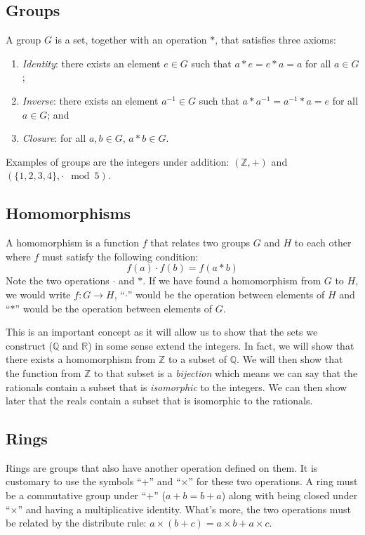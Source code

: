 \documentclass[]{scrartcl}
\theoremstyle{definition}
\newcommand{\bb}[1]{\mathbb{#1}}
\newcommand{\Z}{\bb{Z}}
\newcommand{\Q}{\bb{Q}}
\newcommand{\R}{\bb{R}}
\begin{document}
\subsection{Groups}
A group $G$ is a set, together with an operation $*$, that satisfies three axioms:
\begin{enumerate}
    \item \textit{Identity}: there exists an element $e\in G$ such that $a*e = e*a = a$ for all $a\in G$;
    \item \textit{Inverse}: there exists an element $a^{-1} \in G$ such that $a*a^{-1} = a^{-1}*a = e$ for all $a \in G$; and
    \item \textit{Closure}: for all $a, b \in G$, $a*b\in G$.
\end{enumerate}
Examples of groups are the integers under addition: $(\Z, +)$ and $(\{1,2,3,4\}, \cdot \mod 5)$.

\subsection{Homomorphisms}
A homomorphism is a function $f$ that relates two groups $G$ and $H$ to each other where $f$ must satisfy the following condition:
$$
f(a)\cdot f(b) = f(a*b)
$$
Note the two operations $\cdot$ and $*$. If we have found a homomorphism from $G$ to $H$, we would write $f: G \rightarrow H$, ``$\cdot$'' would be the operation between elements of $H$ and ``$*$'' would be the operation between elements of $G$.

This is an important concept as it will allow us to show that the sets we construct ($\Q$ and $\R$) in some sense extend the integers. In fact, we will show that there exists a homomorphism from $\Z$ to a subset of $\Q$. We will then show that the function from $\Z$ to that subset is a \textit{bijection} which means we can say that the rationals contain a subset that is \textit{isomorphic} to the integers. We can then show later that the reals contain a subset that is isomorphic to the rationals.

\subsection{Rings}
Rings are groups that also have another operation defined on them. It is customary to use the symbols ``$+$'' and ``$\times$'' for these two operations. A ring must be a commutative group under ``$+$'' ($a+b = b+a$) along with being closed under ``$\times$'' and having a multiplicative identity. What's more, the two operations must be related by the distribute rule: $a\times(b+c) = a\times b + a\times c$.
\end{document}
